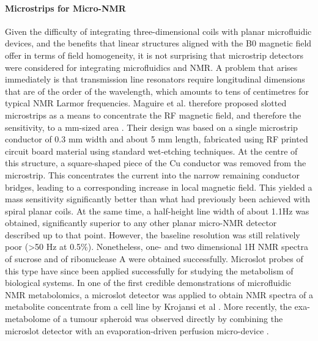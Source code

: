 \paragraph{Microstrips for Micro-NMR}
Given the
difficulty of integrating three-dimensional coils with planar
microfluidic devices, and the benefits that linear structures aligned
with the B0 magnetic field offer in terms of field homogeneity, it is
not surprising that microstrip detectors were considered for integrating
microfluidics and NMR. A problem that arises immediately is that
transmission line resonators require longitudinal dimensions that are of
the order of the wavelength, which amounts to tens of centimetres for
typical NMR Larmor frequencies. Maguire et al. therefore proposed
slotted microstrips as a means to concentrate the RF magnetic field, and
therefore the sensitivity, to a mm-sized area
\cite{Maguire:2009wc,Maguire:2007ko}. Their design was based on a single
microstrip conductor of 0.3 mm width and about 5 mm length, fabricated
using RF printed circuit board material using standard wet-etching
techniques. At the centre of this structure, a square-shaped piece of
the Cu conductor was removed from the microstrip. This concentrates the
current into the narrow remaining conductor bridges, leading to a
corresponding increase in local magnetic field. This yielded a mass
sensitivity significantly better than what had previously been achieved
with spiral planar coils. At the same time, a half-height line width of
about 1.1Hz was obtained, significantly superior to any other planar
micro-NMR detector described up to that point. However, the baseline
resolution was still relatively poor (\textgreater{}50 Hz at 0.5\%).
Nonetheless, one- and two dimensional 1H NMR spectra of sucrose and of
ribonuclease A were obtained successfully. Microslot probes of this type
have since been applied successfully for studying the metabolism of
biological systems. In one of the first credible demonstrations of
microfluidic NMR metabolomics, a microslot detector was applied to
obtain NMR spectra of a metabolite concentrate from a cell line by
Krojansi et al \cite{krojanski2008mnp}. More recently, the exa-metabolome
of a tumour spheroid was observed directly by combining the microslot
detector with an evaporation-driven perfusion micro-device
\cite{Kalfe:2015ik}. 

